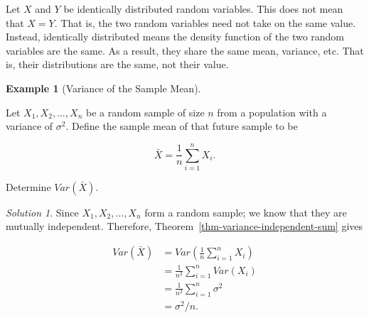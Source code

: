 \documentclass[
  letterpaper,
  DIV=11,
  numbers=noendperiod]{scrreprt}
\theoremstyle{plain}
\theoremstyle{definition}
\theoremstyle{definition}
\newtheorem{example}{Example}[chapter]
\theoremstyle{remark}
\newtheorem*{solution}{Solution}
\begin{document}
\begin{tcolorbox}[enhanced jigsaw, toprule=.15mm, left=2mm, title=\textcolor{quarto-callout-warning-color}{\faExclamationTriangle}\hspace{0.5em}{Warning}, opacityback=0, toptitle=1mm, leftrule=.75mm, colbacktitle=quarto-callout-warning-color!10!white, opacitybacktitle=0.6, titlerule=0mm, breakable, colframe=quarto-callout-warning-color-frame, arc=.35mm, coltitle=black, bottomtitle=1mm, rightrule=.15mm, colback=white, bottomrule=.15mm]

Let \(X\) and \(Y\) be identically distributed random variables. This
does not mean that \(X = Y\). That is, the two random variables need not
take on the same value. Instead, identically distributed means the
density function of the two random variables are the same. As a result,
they share the same mean, variance, etc. That is, their distributions
are the same, not their value.

\end{tcolorbox}

\begin{example}[Variance of the Sample
Mean]\protect\hypertarget{exm-var-xbar}{}\label{exm-var-xbar}

Let \(X_1, X_2, \dotsc, X_n\) be a random sample of size \(n\) from a
population with a variance of \(\sigma^2\). Define the sample mean of
that future sample to be

\[\bar{X} = \frac{1}{n} \sum_{i=1}^{n} X_i.\]

Determine \(Var\left(\bar{X}\right)\).

\end{example}

\begin{solution}

Since \(X_1, X_2, \dotsc, X_n\) form a random sample; we know that they
are mutually independent. Therefore,
Theorem~\ref{thm-variance-independent-sum} gives

\[
\begin{aligned}
  Var\left(\bar{X}\right)
    &= Var\left(\frac{1}{n} \sum_{i=1}^{n} X_i\right) \\
    &= \frac{1}{n^2} \sum_{i=1}^{n} Var\left(X_i\right) \\
    &= \frac{1}{n^2} \sum_{i=1}^{n} \sigma^2 \\
    &= \sigma^2 / n.
\end{aligned}
\]

\end{solution}
\end{document}
